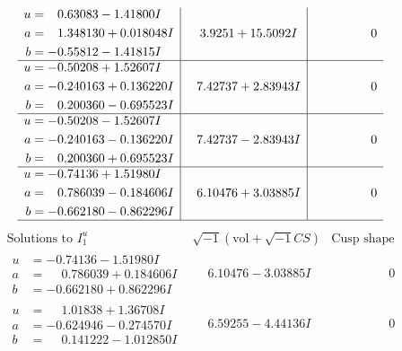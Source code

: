 \documentclass[1p]{elsarticle_modified}
\theoremstyle{definition}
\newcommand{\I}{\sqrt{-1}}
\begin{document}
$$\begin{array}{c|c|c}
\begin{aligned}
u &= \phantom{-}0.63083 - 1.41800 I \\
a &= \phantom{-}1.348130 + 0.018048 I \\
b &= -0.55812 - 1.41815 I\end{aligned}
 & \phantom{-}3.9251 + 15.5092 I & \phantom{-0.000000 } 0 \\ \hline\begin{aligned}
u &= -0.50208 + 1.52607 I \\
a &= -0.240163 + 0.136220 I \\
b &= \phantom{-}0.200360 - 0.695523 I\end{aligned}
 & \phantom{-}7.42737 + 2.83943 I & \phantom{-0.000000 } 0 \\ \hline\begin{aligned}
u &= -0.50208 - 1.52607 I \\
a &= -0.240163 - 0.136220 I \\
b &= \phantom{-}0.200360 + 0.695523 I\end{aligned}
 & \phantom{-}7.42737 - 2.83943 I & \phantom{-0.000000 } 0 \\ \hline\begin{aligned}
u &= -0.74136 + 1.51980 I \\
a &= \phantom{-}0.786039 - 0.184606 I \\
b &= -0.662180 - 0.862296 I\end{aligned}
 & \phantom{-}6.10476 + 3.03885 I & \phantom{-0.000000 } 0\\
 \hline 
 \end{array}$$\newpage$$\begin{array}{c|c|c}  
\text{Solutions to }I^u_{1}& \I (\text{vol} + \sqrt{-1}CS) & \text{Cusp shape}\\
 \hline 
\begin{aligned}
u &= -0.74136 - 1.51980 I \\
a &= \phantom{-}0.786039 + 0.184606 I \\
b &= -0.662180 + 0.862296 I\end{aligned}
 & \phantom{-}6.10476 - 3.03885 I & \phantom{-0.000000 } 0 \\ \hline\begin{aligned}
u &= \phantom{-}1.01838 + 1.36708 I \\
a &= -0.624946 - 0.274570 I \\
b &= \phantom{-}0.141222 - 1.012850 I\end{aligned}
 & \phantom{-}6.59255 - 4.44136 I & \phantom{-0.000000 } 0 \\ \hline\begin{aligned}

\end{aligned}
\end{array}$$
\end{document}
